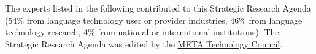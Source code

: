 \documentclass[10pt, plain]{../../metanetpaper}
\begin{document}
\clearpage


\label{sec:list-of-contributors}

\begin{small}
The experts listed in the following contributed to this Strategic Research Agenda (54\% from language technology user or provider industries, 46\% from language technology research, 4\% from national or international institutions). The Strategic Research Agenda was edited by the \href{http://www.meta-net.eu/vision/technology-council-members/all}{META Technology Council}.
\end{small}

%
\end{document}
